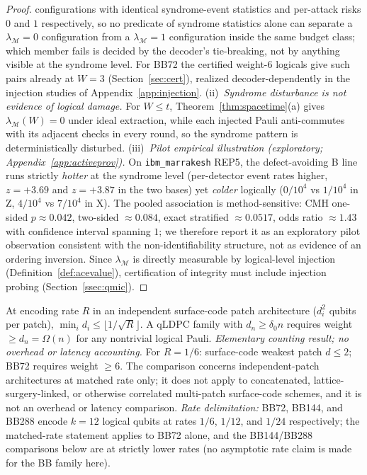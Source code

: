 \documentclass[11pt,a4paper]{article}
\begin{document}
\begin{proof}
configurations with identical syndrome-event statistics and per-attack
risks $0$ and $1$ respectively, so no predicate of syndrome statistics
alone can separate a $\lambda_{\mathcal M}=0$ configuration from a
$\lambda_{\mathcal M}=1$ configuration inside the same budget class;
which member fails is decided by the decoder's tie-breaking, not by
anything visible at the syndrome level. For BB72 the certified
weight-6 logicals give such pairs already at $W=3$
(Section~\ref{sec:cert}), realized decoder-dependently in the injection
studies of Appendix~\ref{app:injection}.
(ii)~\emph{Syndrome disturbance is not evidence of logical damage.}
For $W\le t$, Theorem~\ref{thm:spacetime}(a) gives
$\lambda_{\mathcal{M}}(W)=0$ under ideal extraction, while each
injected Pauli anti-commutes with its adjacent checks in every round,
so the syndrome pattern is deterministically disturbed.
(iii)~\emph{Pilot empirical illustration (exploratory;
Appendix~\ref{app:activeprov}).}
On \texttt{ibm\_marrakesh} REP5, the defect-avoiding B line runs
strictly \emph{hotter} at the syndrome level (per-detector event rates
higher, $z=+3.69$ and $z=+3.87$ in the two bases) yet \emph{colder}
logically ($0/10^4$ vs $1/10^4$ in Z, $4/10^4$ vs $7/10^4$ in X).
The pooled association is method-sensitive: CMH one-sided $p\approx0.042$,
two-sided $\approx0.084$, exact stratified $\approx0.0517$, odds ratio
$\approx1.43$ with confidence interval spanning $1$; we therefore report
it as an exploratory pilot observation consistent with the
non-identifiability structure, not as evidence of an ordering inversion.
Since $\lambda_{\mathcal{M}}$ is
directly measurable by logical-level injection
(Definition~\ref{def:acevalue}), certification of integrity must include
injection probing (Section~\ref{ssec:qmic}).
\end{proof}

\begin{lemma}\label{lem:separation}
At encoding rate $R$ in an independent surface-code patch architecture
($d_i^2$ qubits per patch), $\min_i d_i\le\lfloor1/\!\sqrt{R}\rfloor$.
A qLDPC family with $d_n\ge\delta_0 n$ requires weight $\ge d_n=\Omega(n)$
for any nontrivial logical Pauli.
\emph{Elementary counting result; no overhead or latency accounting.}
For $R=1/6$: surface-code weakest patch $d\le2$; BB72 requires weight $\ge6$.
The comparison concerns independent-patch architectures at matched rate
only; it does not apply to concatenated, lattice-surgery-linked, or
otherwise correlated multi-patch surface-code schemes, and it is not an
overhead or latency comparison. \emph{Rate delimitation:} BB72, BB144,
and BB288 encode $k=12$ logical qubits at rates $1/6$, $1/12$, and
$1/24$ respectively; the matched-rate statement applies to BB72 alone,
and the BB144/BB288 comparisons below are at strictly lower rates (no
asymptotic rate claim is made for the BB family here).
\end{lemma}
\end{document}
